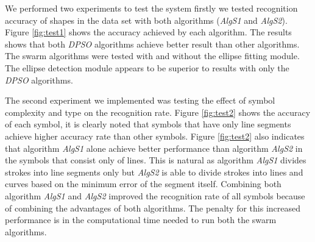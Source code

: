 \documentclass{article}%
\begin{document}
We performed two experiments to test the system firstly we tested recognition accuracy of shapes in the data set with both algorithms (\textsl{AlgS1} and \textsl{AlgS2}). %
  Figure \ref{fig:test1} shows the accuracy achieved by each algorithm. The results shows that both \textit{DPSO} algorithms achieve better result than other algorithms. The swarm algorithms were tested with and without the ellipse fitting module. The ellipse detection module appears to be superior to results with only the \textit{DPSO} algorithms.
  
The second experiment we implemented was testing the effect of symbol complexity and type on the recognition rate. Figure \ref{fig:test2} shows the accuracy of each symbol, it is clearly noted that symbols that have only line segments achieve higher accuracy rate than other symbols. Figure \ref{fig:test2} also indicates that algorithm \textsl{AlgS1} alone achieve better performance than algorithm   \textsl{AlgS2} in the symbols that consist only of lines. This is natural as algorithm  \textsl{AlgS1} divides strokes into line segments only but \textsl{AlgS2} is able to divide strokes into lines and curves based on the minimum error of the segment itself. %
 Combining both algorithm \textsl{AlgS1} and \textsl{AlgS2} improved the recognition rate of all symbols because of combining the advantages of both algorithms. The penalty for this increased performance is in the computational time needed to run both the swarm algorithms.  \\
\end{document}
